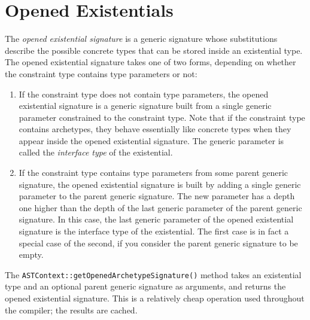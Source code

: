 \documentclass[../generics]{subfiles}
\begin{document}
\fi

\section[]{Opened Existentials}\label{open existential archetypes}

\ifWIP

The \emph{opened existential signature} is a generic signature whose substitutions describe the possible concrete types that can be stored inside an existential type. The opened existential signature takes one of two forms, depending on whether the constraint type contains type parameters or not:
\begin{enumerate}
\item
If the constraint type does not contain type parameters, the opened existential signature is a generic signature built from a single generic parameter \texttt{} constrained to the constraint type. Note that if the constraint type contains archetypes, they behave essentially like concrete types when they appear inside the opened existential signature. The generic parameter \texttt{} is called the \emph{interface type} of the existential.
\item
If the constraint type contains type parameters from some parent generic signature, the opened existential signature is built by adding a single generic parameter to the parent generic signature. The new parameter has a depth one higher than the depth of the last generic parameter of the parent generic signature. In this case, the last generic parameter of the opened existential signature is the interface type of the existential. The first case is in fact a special case of the second, if you consider the parent generic signature to be empty. 
\end{enumerate}
The \texttt{ASTContext::getOpenedArchetypeSignature()} method takes an existential type and an optional parent generic signature as arguments, and returns the opened existential signature. This is a relatively cheap operation used throughout the compiler; the results are cached.
\end{document}
